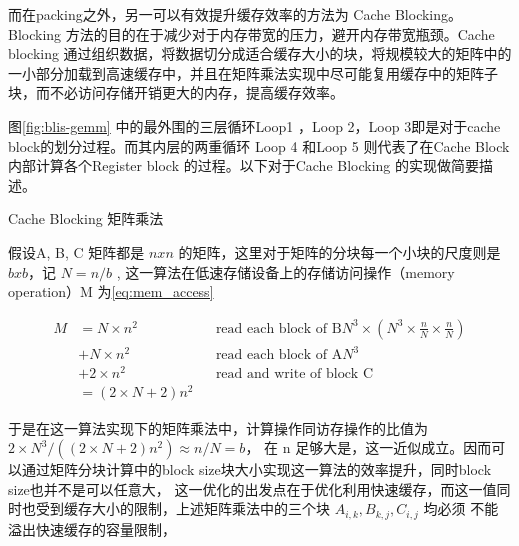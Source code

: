 而在packing之外，另一可以有效提升缓存效率的方法为 Cache Blocking。Blocking 方法的目的在于减少对于内存带宽的压力，避开内存带宽瓶颈。Cache blocking 通过组织数据，将数据切分成适合缓存大小的块，将规模较大的矩阵中的一小部分加载到高速缓存中，并且在矩阵乘法实现中尽可能复用缓存中的矩阵子块，而不必访问存储开销更大的内存，提高缓存效率。

图\ref{fig:blis-gemm} 中的最外围的三层循环Loop1 ，Loop 2，Loop 3即是对于cache block的划分过程。而其内层的两重循环
Loop 4 和Loop 5 则代表了在Cache Block内部计算各个Register block 的过程。以下对于Cache Blocking 的实现做简要描述。

\begin{algorithm}
  \caption{Cache Blocking 矩阵乘法}
  \label{code:tiled_matmul}
\end{algorithm}

假设A, B, C 矩阵都是 $n x n$ 的矩阵，这里对于矩阵的分块每一个小块的尺度则是 $b x b$，记 $N = n / b$ , 这一算法在低速存储设备上的存储访问操作（memory operation）M 为\ref{eq:mem_access}

\begin{align}
  M &= N \times n^2 && \text{read each block of B} N^3 \times (N^3 \times \frac{n}{N} \times \frac{n}{N} ) \\
    &+ N \times n^2 && \text{read each block of A} N^3\\
    &+ 2 \times n^2 && \text{read and write of block C}\\
    &= (2\times N + 2)n^2
\label{eq:mem_access}
\end{align}

于是在这一算法实现下的矩阵乘法中，计算操作同访存操作的比值为 $2\times N^3 / ((2\times N + 2)n^2) \approx n / N = b$，
在 n 足够大是，这一近似成立。因而可以通过矩阵分块计算中的block size块大小实现这一算法的效率提升，同时block size也并不是可以任意大，
这一优化的出发点在于优化利用快速缓存，而这一值同时也受到缓存大小的限制，上述矩阵乘法中的三个块 $A_{i, k}, B_{k, j}, C_{i, j} $ 均必须
不能溢出快速缓存的容量限制，

